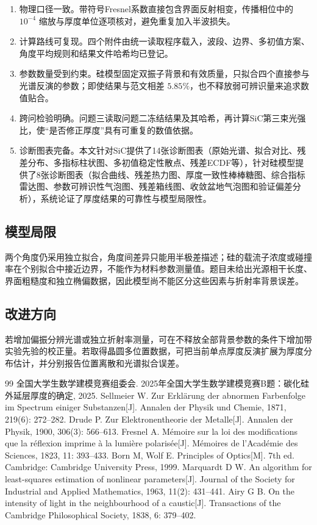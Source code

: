 \documentclass[UTF8,fontset=fandol,12pt,a4paper]{ctexart}
\begin{document}
	\begin{enumerate}
		\item 物理口径一致。带符号Fresnel系数直接包含界面反射相变，传播相位中的 $10^{-4}$ 缩放与厚度单位逐项核对，避免重复加入半波损失。
		\item 计算路线可复现。四个附件由统一读取程序载入，波段、边界、多初值方案、角度平均规则和结果文件哈希均已登记。
		\item 参数数量受到约束。硅模型固定双振子背景和有效质量，只拟合四个直接参与光谱反演的参数；即使结果与范文相差 $5.85\%$，也不释放弱可辨识量来追求数值贴合。
		\item 跨问检验明确。问题三读取问题二冻结结果及其哈希，再计算SiC第三束光强比，使“是否修正厚度”具有可重复的数值依据。
		\item 诊断图表完备。本文针对SiC提供了14张诊断图表（原始光谱、拟合对比、残差分布、多指标柱状图、多初值稳定性散点、残差ECDF等），针对硅模型提供了8张诊断图表（拟合曲线、残差热力图、厚度一致性棒棒糖图、综合指标雷达图、参数可辨识性气泡图、残差箱线图、收敛盆地气泡图和验证偏差分析），系统论证了厚度结果的可靠性与模型局限性。
	\end{enumerate}
	
	\subsection{模型局限}
	
	两个角度仍采用独立拟合，角度间差异只能用半极差描述；硅的载流子浓度或碰撞率在个别拟合中接近边界，不能作为材料参数测量值。题目未给出光源相干长度、界面粗糙度和独立椭偏数据，因此模型尚不能区分这些因素与折射率背景误差。
	
	\subsection{改进方向}
	
	若增加偏振分辨光谱或独立折射率测量，可在不释放全部背景参数的条件下增加带实验先验的校正量。若取得晶圆多位置数据，可把当前单点厚度反演扩展为厚度分布估计，并分别报告位置离散和光谱拟合误差。
	
	\newpage
	\begin{thebibliography}{99}
		 全国大学生数学建模竞赛组委会. 2025年全国大学生数学建模竞赛B题：碳化硅外延层厚度的确定, 2025.
		 Sellmeier W. Zur Erklärung der abnormen Farbenfolge im Spectrum einiger Substanzen[J]. Annalen der Physik und Chemie, 1871, 219(6): 272--282.
		 Drude P. Zur Elektronentheorie der Metalle[J]. Annalen der Physik, 1900, 306(3): 566--613.
		 Fresnel A. Mémoire sur la loi des modifications que la réflexion imprime à la lumière polarisée[J]. Mémoires de l'Académie des Sciences, 1823, 11: 393--433.
		 Born M, Wolf E. Principles of Optics[M]. 7th ed. Cambridge: Cambridge University Press, 1999.
		 Marquardt D W. An algorithm for least-squares estimation of nonlinear parameters[J]. Journal of the Society for Industrial and Applied Mathematics, 1963, 11(2): 431--441.
		 Airy G B. On the intensity of light in the neighbourhood of a caustic[J]. Transactions of the Cambridge Philosophical Society, 1838, 6: 379--402.
	\end{thebibliography}
	
\end{document}
